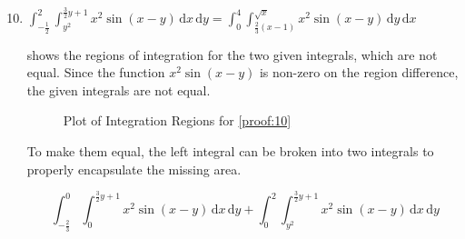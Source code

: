 \documentclass[11pt]{article}
\begin{document}
\begin{enumerate}
  \setcounter{enumi}{9}
  
\item
  \(\int_{-\frac{1}{2}}^{2} \int_{y^2}^{\frac{3}{2}y+1} x^2 \sin(x-y)
  \,\mathrm{d}x\,\mathrm{d}y = \int_0^4 \int_{\frac{2}{3}(x-1)}^{\sqrt{x}} x^2
  \sin(x-y) \, \mathrm{d}y \, \mathrm{d}x\) \label{proof:10}

   shows the regions of integration for the two given
  integrals, which are not equal. Since the function \(x^2 \sin(x - y)\) is
  non-zero on the region difference, the given integrals are not equal.

  \begin{figure}[h]
    \centering
    \caption{Plot of Integration Regions for \cref{proof:10}}
    \label{fig:10-region-plot}
    \hspace{1cm}
  \end{figure}

  To make them equal, the left integral can be broken into two integrals to
  properly encapsulate the missing area.

  \begin{equation*}
    \int_{-\frac{2}{3}}^{0} \int_{0}^{\frac{3}{2}y+1} x^2 \sin(x-y)
    \,\mathrm{d}x\,\mathrm{d}y + 
    \int_{0}^{2} \int_{y^2}^{\frac{3}{2}y+1} x^2 \sin(x-y)
    \,\mathrm{d}x\,\mathrm{d}y
  \end{equation*}
  

\end{enumerate}
\end{document}
